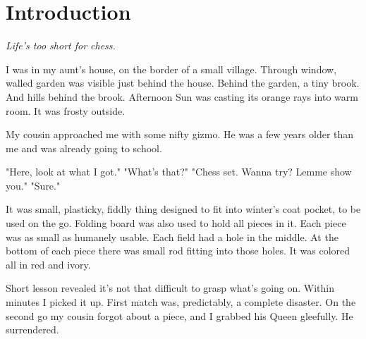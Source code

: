 

\chapter*{Introduction}
\label{ch:Introduction}

\begin{flushright}
\parbox{0.6\textwidth}{
\emph{Life's too short for chess. \newline
{} } }
\end{flushright}

\noindent
I was in my aunt's house, on the border of a small village.
Through window, walled garden was visible just behind the house.
Behind the garden, a tiny brook. And hills behind the brook.
Afternoon Sun was casting its orange rays into warm room. It
was frosty outside.

My cousin approached me with some nifty gizmo. He was a
few years older than me and was already going to school.

\noindent
"Here, look at what I got." \newline
\hspace*{\fill}"What's that?" \newline
"Chess set. Wanna try? Lemme show you." \newline
\hspace*{\fill}"Sure."

It was small, plasticky, fiddly thing designed to fit into winter's
coat pocket, to be used on the go. Folding board was also used to
hold all pieces in it. Each piece was as small as humanely usable.
Each field had a hole in the middle. At the bottom of each piece
there was small rod fitting into those holes. It was colored all
in red and ivory.

Short lesson revealed it's not that difficult to grasp what's going
on. Within minutes I picked it up. First match was, predictably, a
complete disaster. On the second go my cousin forgot about a piece,
and I grabbed his Queen gleefully. He surrendered.

